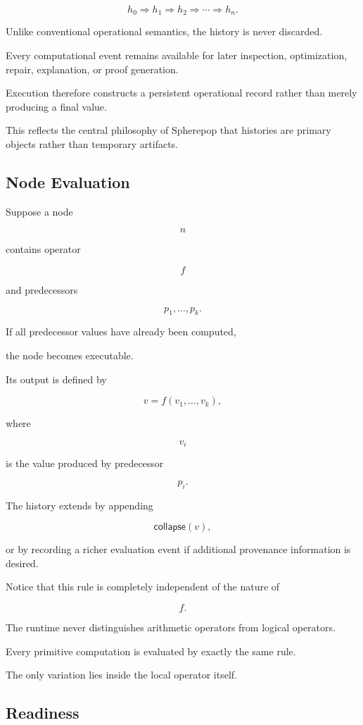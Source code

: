 \documentclass[12pt,oneside]{article}
\newcommand{\Collapse}{\mathsf{collapse}}
\begin{document}
\[
h_0
\Longrightarrow
h_1
\Longrightarrow
h_2
\Longrightarrow
\cdots
\Longrightarrow
h_n.
\]

Unlike conventional operational semantics, the history is never discarded.

Every computational event remains available for later inspection, optimization, repair, explanation, or proof generation.

Execution therefore constructs a persistent operational record rather than merely producing a final value.

This reflects the central philosophy of Spherepop that histories are primary objects rather than temporary artifacts.

\subsection{Node Evaluation}

Suppose a node

\[
n
\]

contains operator

\[
f
\]

and predecessors

\[
p_1,\ldots,p_k.
\]

If all predecessor values have already been computed,

the node becomes executable.

Its output is defined by

\[
v
=
f(v_1,\ldots,v_k),
\]

where

\[
v_i
\]

is the value produced by predecessor

\[
p_i.
\]

The history extends by appending

\[
\Collapse(v),
\]

or by recording a richer evaluation event if additional provenance information is desired.

Notice that this rule is completely independent of the nature of

\[
f.
\]

The runtime never distinguishes arithmetic operators from logical operators.

Every primitive computation is evaluated by exactly the same rule.

The only variation lies inside the local operator itself.

\subsection{Readiness}
\end{document}
